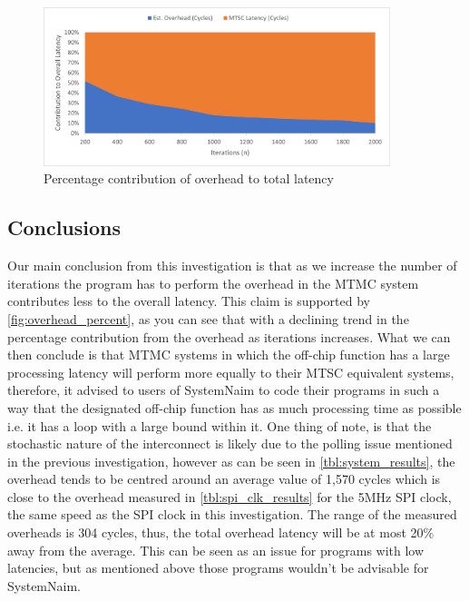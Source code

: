 \begin{figure}[!htb]
    \centering
    \includegraphics[width=0.9\textwidth]{05_evaluation/images/overhead_percentage.png}
    \caption{Percentage contribution of overhead to total latency}
    \label{fig:overhead_percent}
\end{figure}

\subsection{Conclusions}

Our main conclusion from this investigation is that as we increase the number of iterations the program has to perform the overhead in the MTMC system contributes less to the overall latency. This claim is supported by \autoref{fig:overhead_percent}, as you can see that with a declining trend in the percentage contribution from the overhead as iterations increases. What we can then conclude is that MTMC systems in which the off-chip function has a large processing latency will perform more equally to their MTSC equivalent systems, therefore, it advised to users of SystemNaim to code their programs in such a way that the designated off-chip function has as much processing time as possible i.e. it has a loop with a large bound within it. One thing of note, is that the stochastic nature of the interconnect is likely due to the polling issue mentioned in the previous investigation, however as can be seen in \autoref{tbl:system_results}, the overhead tends to be centred around an average value of 1,570 cycles which is close to the overhead measured in \autoref{tbl:spi_clk_results} for the 5MHz SPI clock, the same speed as the SPI clock in this investigation. The range of the measured overheads is 304 cycles, thus, the total overhead latency will be at most 20\% away from the average. This can be seen as an issue for programs with low latencies, but as mentioned above those programs wouldn't be advisable for SystemNaim.

